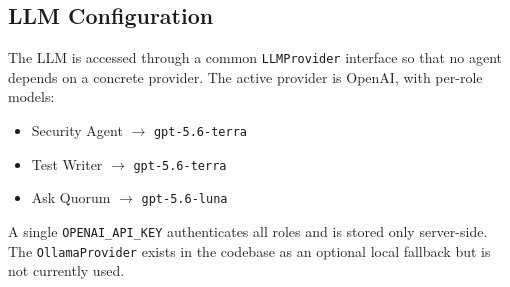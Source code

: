 \subsection{LLM Configuration}

The LLM is accessed through a common \texttt{LLMProvider} interface so that
no agent depends on a concrete provider. The active provider is OpenAI, with
per-role models:

\begin{itemize}
  \item Security Agent $\rightarrow$ \texttt{gpt-5.6-terra}
  \item Test Writer $\rightarrow$ \texttt{gpt-5.6-terra}
  \item Ask Quorum $\rightarrow$ \texttt{gpt-5.6-luna}
\end{itemize}

A single \texttt{OPENAI\_API\_KEY} authenticates all roles and is stored only
server-side. The \texttt{OllamaProvider} exists in the codebase as an optional
local fallback but is not currently used.
